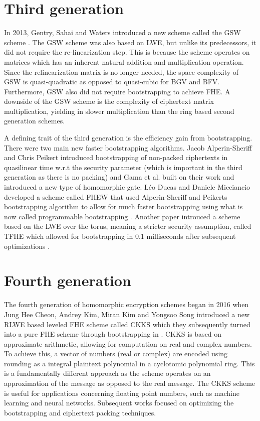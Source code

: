 \section{Third generation}
In 2013, Gentry, Sahai and Waters introduced a new scheme called the GSW scheme \cite{GSW13}. The GSW scheme was also based on LWE, but unlike its predecessors, it did not require the re-linearization step. This is because the scheme operates on matrices which has an inherent natural addition and multiplication operation. Since the relinearization matrix is no longer needed, the space complexity of GSW is quasi-quadratic as opposed to quasi-cubic for BGV and BFV. Furthermore, GSW also did not require bootstrapping to achieve FHE. A downside of the GSW scheme is the complexity of ciphertext matrix multiplication, yielding in slower multiplication than the ring based second generation schemes.

A defining trait of the third generation is the efficiency gain from bootstrapping. There were two main new faster bootstrapping algorithms. Jacob Alperin-Sheriff and Chris Peikert \cite{A-S-P-boot} introduced bootstrapping of non-packed ciphertexts in quasilinear time w.r.t the security parameter (which is important in the third generation as there is no packing) and Gama et al. \cite{Gama-boot} built on their work and introduced a new type of homomorphic gate. Léo Ducas and Daniele Micciancio developed a scheme called FHEW that used Alperin-Sheriff and Peikerts bootstrapping algorithm to allow for much faster bootstrapping using what is now called programmable bootstrapping \cite{FHEW}. Another paper introuced a scheme based on the LWE over the torus, meaning a stricter security assumption, called TFHE \cite{TFHE} which allowed for bootstrapping in 0.1 milliseconds after subsequent optimizations \cite{MP-fhew-tfhe}.

\section{Fourth generation}
The fourth generation of homomorphic encryption schemes began in 2016 when Jung Hee Cheon, Andrey Kim, Miran Kim and Yongsoo Song introduced a new RLWE based leveled FHE scheme called CKKS \cite{CKKS16} which they subsequently turned into a pure FHE scheme through bootstrapping in \cite{CKKS-boot}. CKKS is based on approximate arithmetic, allowing for computation on real and complex numbers. To achieve this, a vector of numbers (real or complex) are encoded using rounding as a integral plaintext polynomial in a cyclotomic polynomial ring. This is a fundamentally different approach as the scheme operates on an approximation of the message as opposed to the real message. The CKKS scheme is useful for applications concerning floating point numbers, such as machine learning and neural networks. Subsequent works focused on optimizing the bootstrapping and ciphertext packing techniques.

